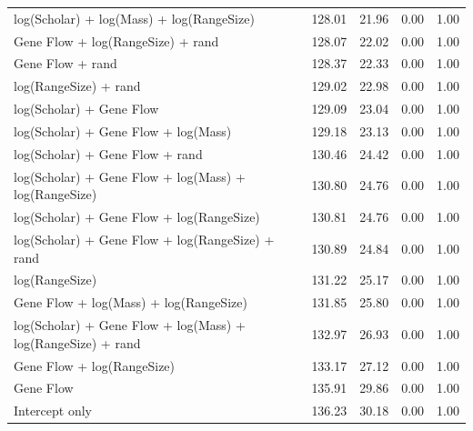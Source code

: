 \begin{table}[ht]
\begin{tabular}{@{}lrrrr@{}}
  log(Scholar) + log(Mass) + log(RangeSize) & 128.01 & 21.96 & 0.00 & 1.00 \\ 
  Gene Flow + log(RangeSize) + rand & 128.07 & 22.02 & 0.00 & 1.00 \\ 
  Gene Flow + rand & 128.37 & 22.33 & 0.00 & 1.00 \\ 
  log(RangeSize) + rand & 129.02 & 22.98 & 0.00 & 1.00 \\ 
  log(Scholar) + Gene Flow & 129.09 & 23.04 & 0.00 & 1.00 \\ 
  log(Scholar) + Gene Flow + log(Mass) & 129.18 & 23.13 & 0.00 & 1.00 \\ 
  log(Scholar) + Gene Flow + rand & 130.46 & 24.42 & 0.00 & 1.00 \\ 
  log(Scholar) + Gene Flow + log(Mass) + log(RangeSize) & 130.80 & 24.76 & 0.00 & 1.00 \\ 
  log(Scholar) + Gene Flow + log(RangeSize) & 130.81 & 24.76 & 0.00 & 1.00 \\ 
  log(Scholar) + Gene Flow + log(RangeSize) + rand & 130.89 & 24.84 & 0.00 & 1.00 \\ 
  log(RangeSize) & 131.22 & 25.17 & 0.00 & 1.00 \\ 
  Gene Flow + log(Mass) + log(RangeSize) & 131.85 & 25.80 & 0.00 & 1.00 \\ 
  log(Scholar) + Gene Flow + log(Mass) + log(RangeSize) + rand & 132.97 & 26.93 & 0.00 & 1.00 \\ 
  Gene Flow + log(RangeSize) & 133.17 & 27.12 & 0.00 & 1.00 \\ 
  Gene Flow & 135.91 & 29.86 & 0.00 & 1.00 \\ 
  Intercept only & 136.23 & 30.18 & 0.00 & 1.00 \\ 
   \bottomrule
\end{tabular}
\endgroup
\end{table}









